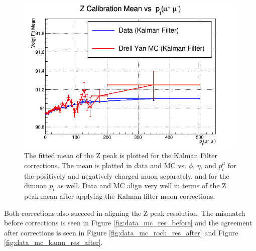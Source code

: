 \begin{figure}[!h]
  \includegraphics[width=0.32\linewidth]{images/muon_calib/zcal_kamu_mc-data_mean_dimu_pt.png}
  \caption[The Z peak mean and its alignment in data and MC after Kalman Filter corrections.]
   {The fitted mean of the Z peak is plotted for the Kalman Filter corrections. The mean is plotted in data and MC vs. $\phi$, $\eta$, and $p_t^\mu$ for the positively and negatively charged muon separately, and for the dimuon $p_t$ as well. Data and MC align very well in terms of the Z peak mean after applying the Kalman filter muon corrections.}
  \label{fig:data_mc_kamu_mean_after}
\end{figure}
Both corrections also succeed in aligning the Z peak resolution. The mismatch before corrections is seen in Figure \ref{fig:data_mc_res_before} and the agreement after corrections is seen in Figure \ref{fig:data_mc_roch_res_after} and Figure \ref{fig:data_mc_kamu_res_after}.
